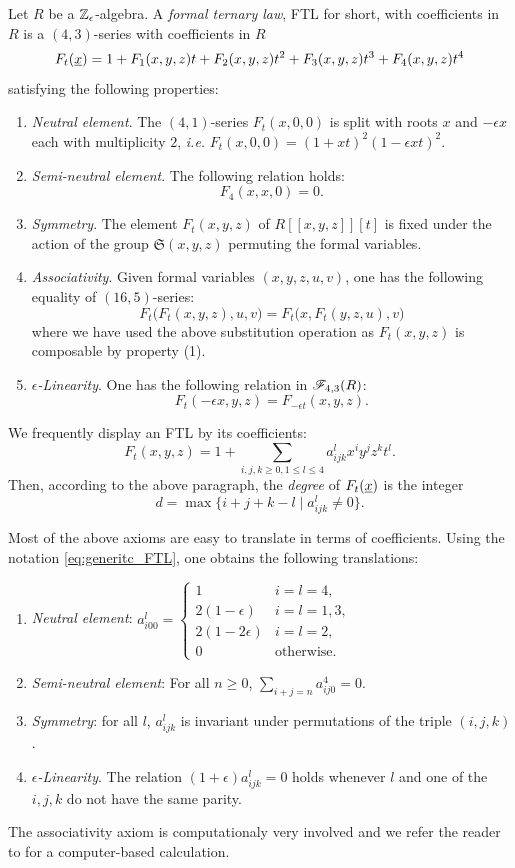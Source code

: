 \begin{df}\label{df:FTL}
Let $R$ be a $\mathbb{Z}_\epsilon$-algebra.
A \emph{formal ternary law}, FTL for short,
 with coefficients in $R$ is a $(4,3)$-series with coefficients in $R$
$$
F_t(\underline x)=1+F_1(x,y,z)t+F_2(x,y,z)t^2+F_3(x,y,z)t^3+F_4(x,y,z)t^4
$$
satisfying the following properties:
\begin{enumerate}
\item \textit{Neutral element}. The $(4,1)$-series $F_t(x,0,0)$ is split
with roots $x$ and $-\epsilon x$ each with multiplicity $2$,
 \emph{i.e.} $F_t(x,0,0)=(1+xt)^2(1-\epsilon xt)^2$.
\item \textit{Semi-neutral element}. The following relation holds:
$$
F_4(x,x,0)=0.
$$
\item \textit{Symmetry}. The element $F_t(x,y,z)$ of $R[[x,y,z]][t]$ is fixed
 under the action of the group $\mathfrak S(x,y,z)$ permuting the formal variables.
\item \textit{Associativity}. Given formal variables $(x,y,z,u,v)$,
 one has the following equality of $(16,5)$-series:
$$
F_t\big(F_t(x,y,z),u,v\big)=F_t\big(x,F_t(y,z,u),v\big)
$$
where we have used the above substitution operation as $F_t(x,y,z)$ is composable by property (1).
\item \textit{$\epsilon$-Linearity}. One has the following relation in $\mathscr F_{4,3}(R)$:
$$
F_t(-\epsilon x,y,z)=F_{-\epsilon t}(x,y,z).
$$
\end{enumerate}
We frequently display an FTL by its coefficients:
\begin{equation}\label{eq:generitc_FTL}
F_t(x,y,z)=1+\sum_{i,j,k\geq 0, 1 \leq l \leq 4} a_{ijk}^lx^iy^jz^kt^l.
\end{equation}
Then, according to the above paragraph, the \emph{degree} of $F_t(\underline x)$ is the integer
$$
d=\max \{i+j+k-l \mid a_{ijk}^l \neq 0\}.
$$
\end{df}

\begin{rem} Most of the above axioms are easy to translate in terms of coefficients.
 Using the notation \eqref{eq:generitc_FTL}, one obtains the following translations:
\begin{enumerate}
\item \textit{Neutral element}:
 $a_{i00}^l=\begin{cases}
1 & i=l=4, \\
2(1-\epsilon) & i=l=1,3, \\
2(1-2\epsilon) & i=l=2, \\
0 & \text{otherwise.}
\end{cases}$
\item \textit{Semi-neutral element}: For all $n \geq 0$, $\sum_{i+j=n} a^4_{ij0}=0$.
\item \textit{Symmetry}: for all $l$, $a_{ijk}^l$ is invariant under permutations of the triple $(i,j,k)$.
\item[(5)] \textit{$\epsilon$-Linearity}. The relation $(1+\epsilon)a_{ijk}^l=0$ holds
 whenever $l$ and one of the $i,j,k$ do not have the same parity.
\end{enumerate}
The associativity axiom is computationaly very involved and we refer the reader to \cite[Appendix]{CDFH}
 for a computer-based calculation.
\end{rem}

